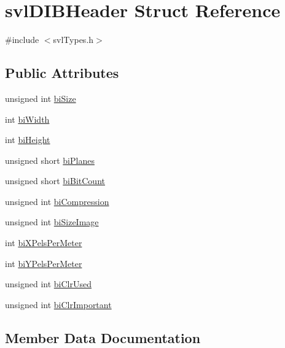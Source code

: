 \hypertarget{structsvl_d_i_b_header}{}\section{svl\+D\+I\+B\+Header Struct Reference}
\label{structsvl_d_i_b_header}


{\ttfamily \#include $<$svl\+Types.\+h$>$}

\subsection*{Public Attributes}
\begin{DoxyCompactItemize}
\item 
unsigned int \hyperlink{structsvl_d_i_b_header_a5e0fed239ff25a4907c0f7323a0038a3}{bi\+Size}
\item 
int \hyperlink{structsvl_d_i_b_header_a3297bdf6492272cb1e19e98794c65cdd}{bi\+Width}
\item 
int \hyperlink{structsvl_d_i_b_header_a80fbfb83bb1befd16f14fd4b41a00c1a}{bi\+Height}
\item 
unsigned short \hyperlink{structsvl_d_i_b_header_ae5d7459ee8a98645740c173a962b378d}{bi\+Planes}
\item 
unsigned short \hyperlink{structsvl_d_i_b_header_a87b1b61efce80e91fd3d481d1c1c4651}{bi\+Bit\+Count}
\item 
unsigned int \hyperlink{structsvl_d_i_b_header_a7388ea79988ca642d73801593ff24f14}{bi\+Compression}
\item 
unsigned int \hyperlink{structsvl_d_i_b_header_a157a9a2b36641c574ef0b99033c41f69}{bi\+Size\+Image}
\item 
int \hyperlink{structsvl_d_i_b_header_a395be28cc1949a72a08fbea783c9b4d9}{bi\+X\+Pels\+Per\+Meter}
\item 
int \hyperlink{structsvl_d_i_b_header_a9a1b75645d1f907fd4ee74041273d48b}{bi\+Y\+Pels\+Per\+Meter}
\item 
unsigned int \hyperlink{structsvl_d_i_b_header_a7054e9748d123a59d12fad55199a5fc5}{bi\+Clr\+Used}
\item 
unsigned int \hyperlink{structsvl_d_i_b_header_afd4f21f7bda819d5bb360efcdc93769b}{bi\+Clr\+Important}
\end{DoxyCompactItemize}


\subsection{Member Data Documentation}
\hypertarget{structsvl_d_i_b_header_a87b1b61efce80e91fd3d481d1c1c4651}{}
